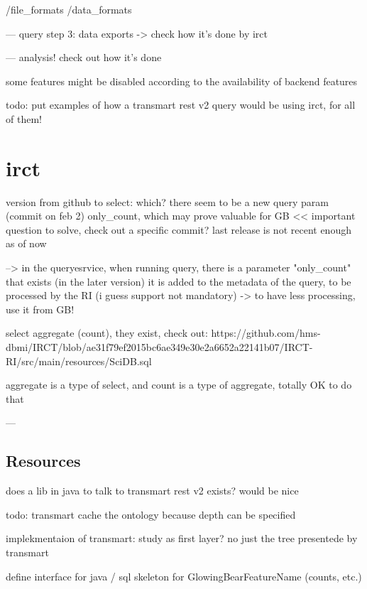 /file\_formats
/data\_formats


--- query step 3: data exports
-> check how it's done by irct

--- analysis! check out how it's done



some features might be disabled according to the availability of backend features

todo: put examples of how a transmart rest v2 query would be using irct, for all of them!




\section{irct}
version from github to select: which? there seem to be a new query param (commit on feb 2) only\_count, which may prove valuable for GB << important question to solve, check out a specific commit? last release is not recent enough as of now 

--> in the queryesrvice, when running query, there is a parameter "only\_count" that exists (in the later version)
it is added to the metadata of the query, to be processed by the RI (i guess support not mandatory) 
-> to have less processing, use it from GB!

select aggregate (count), they exist, check out: https://github.com/hms-dbmi/IRCT/blob/ae31f79ef2015bc6ae349e30e2a6652a22141b07/IRCT-RI/src/main/resources/SciDB.sql

aggregate is a type of select, and count is a type of aggregate, totally OK to do that 



---
\subsection{Resources}
does a lib in java to talk to transmart rest v2 exists? would be nice


todo: transmart cache the ontology because depth can be specified

implekmentaion of transmart: study as first layer? no just the tree presentede by transmart

define interface for java / sql skeleton for GlowingBearFeatureName (counts, etc.)